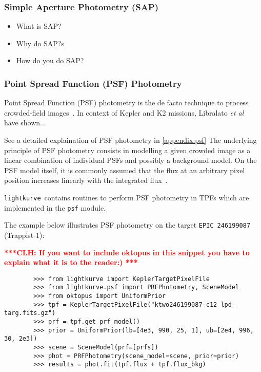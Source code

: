 \documentclass[twocolumn]{aastex62}
\newcommand{\lightkurve}{\texttt{lightkurve}}
\newcommand{\clh}[1]{\textcolor{red}{ \textbf{***CLH: #1 ***}}}
\begin{document}
    \subsubsection{Simple Aperture Photometry (SAP)}
    \begin{itemize}
        \item What is SAP?
        \item Why do SAP?s
        \item How do you do SAP?
    \end{itemize}

    \subsubsection{Point Spread Function (PSF) Photometry}
        Point Spread Function (PSF) photometry is the de facto technique to
        process crowded-field images~\cite{stetson1987, heasley1999}. In context of Kepler
        and K2 missions, Libralato \textit{et al}~\cite{libralato2016} have shown...

        See a detailed explaination of PSF photometry in \ref{appendix:psf}
        The underlying principle of PSF photometry consists in modelling a given crowded
        image as a linear combination of individual PSFs and possibly a background model.
        On the PSF model itself, it is commonly assumed that the flux
        at an arbitrary pixel position increases linearly with the integrated
        flux~\cite{stetson1987, heasley1999}.

        \lightkurve ~contains routines to perform PSF photometry in TPFs
        which are implemented in the \texttt{psf} module.

        The example below illustrates PSF photometry on the target \texttt{EPIC 246199087}
        (Trappist-1):

        \clh{If you want to include oktopus in this snippet you have to explain what it is to the reader:)}
        \begin{verbatim}
        >>> from lightkurve import KeplerTargetPixelFile
        >>> from lightkurve.psf import PRFPhotometry, SceneModel
        >>> from oktopus import UniformPrior
        >>> tpf = KeplerTargetPixelFile("ktwo246199087-c12_lpd-targ.fits.gz")
        >>> prf = tpf.get_prf_model()
        >>> prior = UniformPrior(lb=[4e3, 990, 25, 1], ub=[2e4, 996, 30, 2e3])
        >>> scene = SceneModel(prf=[prfs])
        >>> phot = PRFPhotometry(scene_model=scene, prior=prior)
        >>> results = phot.fit(tpf.flux + tpf.flux_bkg)
        \end{verbatim}
\end{document}

